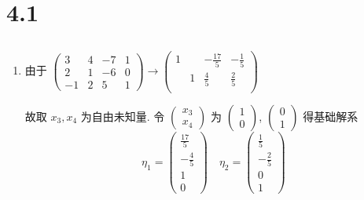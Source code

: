 \section{4.1}
 \subsection{} %
	 \paragraph{} %
		 \begin{enumerate}
			 \item %
			       由于 \( \begin{pmatrix}
				       3  & 4 & -7 & 1 \\
				       2  & 1 & -6 & 0 \\
				       -1 & 2 & 5  & 1
			       \end{pmatrix} \rightarrow \begin{pmatrix}
				       1 &   & -\frac{17}{5} & -\frac{1}{5} \\
				         & 1 & \frac{4}{5}   & \frac{2}{5}  \\
				         &   &               &
			       \end{pmatrix} \)

			       故取 \( x_{3}, x_{4} \) 为自由未知量. 令 \( \begin{pmatrix}
				       x_{3} \\
				       x_{4}
			       \end{pmatrix} \) 为 \( \begin{pmatrix}
				       1 \\
				       0
			       \end{pmatrix} \), \( \begin{pmatrix}
				       0 \\
				       1
			       \end{pmatrix} \) 得基础解系\[ \eta_{1} = \begin{pmatrix}
					       \frac{17}{5} \\
					       -\frac{4}{5} \\
					       1            \\
					       0
				       \end{pmatrix} \quad \eta_{2} = \begin{pmatrix}
					       \frac{1}{5}  \\
					       -\frac{2}{5} \\
					       0            \\
					       1
				       \end{pmatrix} \]


\end{enumerate}
